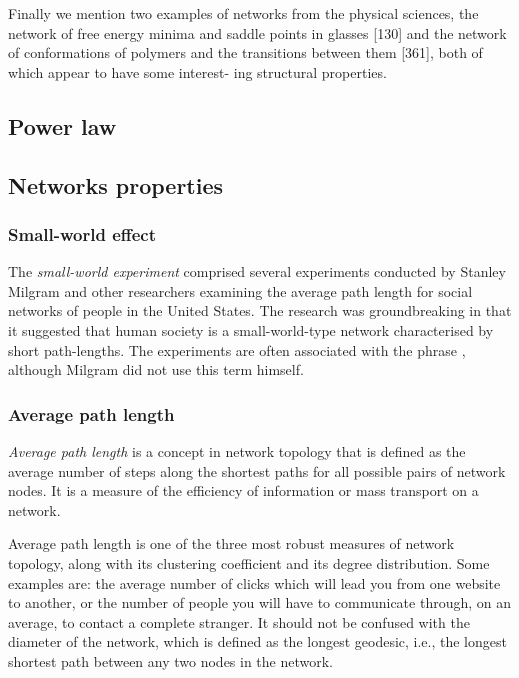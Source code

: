       Finally we mention two examples of networks from the physical sciences, the network of free energy minima and saddle points in glasses [130] and the network of conformations of polymers and the transitions between them [361], both of which appear to have some interest- ing structural properties.
      
  \subsection{Power law}
  
    
    
  \subsection{Networks properties}
    
    \subsubsection{Small-world effect}
      
      The \emph{small-world experiment} comprised several experiments conducted by Stanley Milgram and other researchers examining the average path length for social networks of people in the United States. The research was groundbreaking in that it suggested that human society is a small-world-type network characterised by short path-lengths. The experiments are often associated with the phrase , although Milgram did not use this term himself.
  
    \subsubsection{Average path length}
    
      \emph{Average path length} is a concept in network topology that is defined as the average number of steps along the shortest paths for all possible pairs of network nodes. It is a measure of the efficiency of information or mass transport on a network.
      
      Average path length is one of the three most robust measures of network topology, along with its clustering coefficient and its degree distribution. Some examples are: the average number of clicks which will lead you from one website to another, or the number of people you will have to communicate through, on an average, to contact a complete stranger. It should not be confused with the diameter of the network, which is defined as the longest geodesic, i.e., the longest shortest path between any two nodes in the network.


